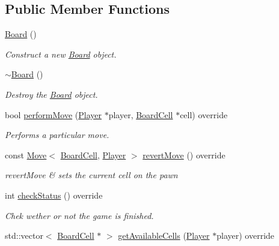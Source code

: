 \subsection*{Public Member Functions}
\begin{DoxyCompactItemize}
\item 
\hyperlink{classgame_1_1tic__tac__toe_1_1_board_a90e2255675eacaefca2cd89aea681096}{Board} ()
\begin{DoxyCompactList}\small\item\em Construct a new \hyperlink{classgame_1_1tic__tac__toe_1_1_board}{Board} object. \end{DoxyCompactList}\item 
\hyperlink{classgame_1_1tic__tac__toe_1_1_board_a9711ce067abe1b2f022fde57106c0425}{$\sim$\+Board} ()
\begin{DoxyCompactList}\small\item\em Destroy the \hyperlink{classgame_1_1tic__tac__toe_1_1_board}{Board} object. \end{DoxyCompactList}\item 
bool \hyperlink{classgame_1_1tic__tac__toe_1_1_board_a08d914b0a618b2e35dcd5016ceba1b23}{perform\+Move} (\hyperlink{classgame_1_1tic__tac__toe_1_1_player}{Player} $\ast$player, \hyperlink{classgame_1_1tic__tac__toe_1_1_board_cell}{Board\+Cell} $\ast$cell) override
\begin{DoxyCompactList}\small\item\em Performs a particular move. \end{DoxyCompactList}\item 
const \hyperlink{structgame_1_1_move}{Move}$<$ \hyperlink{classgame_1_1tic__tac__toe_1_1_board_cell}{Board\+Cell}, \hyperlink{classgame_1_1tic__tac__toe_1_1_player}{Player} $>$ \hyperlink{classgame_1_1tic__tac__toe_1_1_board_ac77aad0bb0945d12a959bb8db0e31908}{revert\+Move} () override
\begin{DoxyCompactList}\small\item\em revert\+Move \& sets the current cell on the pawn \end{DoxyCompactList}\item 
int \hyperlink{classgame_1_1tic__tac__toe_1_1_board_ae91180193e944c9c58d7d1d0f439918e}{check\+Status} () override
\begin{DoxyCompactList}\small\item\em Chek wether or not the game is finished. \end{DoxyCompactList}\item 
std\+::vector$<$ \hyperlink{classgame_1_1tic__tac__toe_1_1_board_cell}{Board\+Cell} $\ast$ $>$ \hyperlink{classgame_1_1tic__tac__toe_1_1_board_a68eea4b31da1c8b4cf90ff0d6bc9d232}{get\+Available\+Cells} (\hyperlink{classgame_1_1tic__tac__toe_1_1_player}{Player} $\ast$player) override

\end{DoxyCompactItemize}

